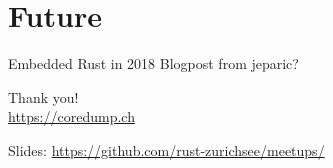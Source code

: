 \documentclass[aspectratio=1610,14pt,t]{beamer}
\begin{document}
\section{Future}

\begin{frame}[c]{Embedded Rust in 2018}
  Blogpost from jeparic?
\end{frame}


{
\begin{frame}[standout]
  \begin{centering}
    {\Huge Thank you!}\\
    {\normalsize \url{https://coredump.ch}}\\
  \end{centering}
  {\small Slides: \url{https://github.com/rust-zurichsee/meetups/}}\\
  \vspace{3cm}
\end{frame}
}
\end{document}
